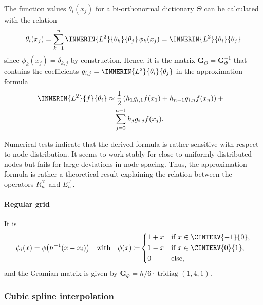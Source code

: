 \documentclass[a4paper]{paper}
\newcommand*{\SPC}[1]{{\ensuremath{\mathscr{#1}}}}
\newcommand*{\EXT}[2]{\ensuremath{E_{#1}^{#2}}}
\newcommand*{\REST}[2]{\ensuremath{R_{#1}^{#2}}}
\newcommand*{\RnX}{{\ensuremath{\REST{n}{\SPC{X}}}}}
\newcommand*{\EnX}{{\ensuremath{\EXT{n}{\SPC{X}}}}}
\DeclareMathOperator{\TRIDIAG}{{tridiag}}
\DeclareMathOperator{\DEFEQ}{{\coloneqq}}
\newcommand*{\BDG}{\boldsymbol{G}}
\begin{document}
%
The function values $\theta_i(x_j)$ for a bi-orthonormal dictionary $\Theta$ can be calculated with the 
relation
%
\begin{equation*}
 \theta_i(x_j) 
 = \sum_{k=1}^n \INNERIN{L^2}{\theta_k}{\theta_j}\, \phi_k(x_j)
 = \INNERIN{L^2}{\theta_i}{\theta_j}
\end{equation*}
%
since $\phi_k(x_j) = \delta_{k,j}$ by construction. Hence, it is the matrix $\BDG_\Theta = 
\BDG_\Phi^{-1}$ 
that contains the coefficients $g_{i,j} = \INNERIN{L^2}{\theta_i}{\theta_j}$ in the approximation formula
%
\begin{align*}
 \INNERIN{L^2}{f}{\theta_i}
 & \approx \frac{1}{2}\left(
 h_1 g_{i,1} f(x_1) + h_{n-1} g_{i,n} f(x_n)  
 \right) + \phantom{x} \\
 &\hspace{10pt} \sum_{j=2}^{n-1} \bar h_j g_{i,j} f(x_j).
\end{align*}

\begin{remark}
 Numerical tests indicate that the derived formula is rather sensitive with respect to node distribution. It seems to 
 work stably for close to uniformly distributed nodes but fails for large deviations in node spacing. Thus, the 
 approximation formula is rather a theoretical result explaining the relation between the operators $\RnX$ and $\EnX$.
\end{remark}

\paragraph{Regular grid}

It is
%
\begin{equation*}
 \phi_i(x) = \phi\big( h^{-1}(x-x_i) \big)
 \quad \text{with} \quad
 \phi(x) \DEFEQ
 \begin{dcases}
  1 + x & \text{if } x \in \CINTERV{-1}{0}, \\
  1-x & \text{if } x \in \CINTERV{0}{1}, \\
  0 & \text{else},
 \end{dcases}
\end{equation*}
%
and the Gramian matrix is given by $\BDG_\Phi = h/6\cdot \TRIDIAG(1,4,1)$.
%



\subsubsection{Cubic spline interpolation}
\label{subsubsec:specif:interp:cubic}
\end{document}
